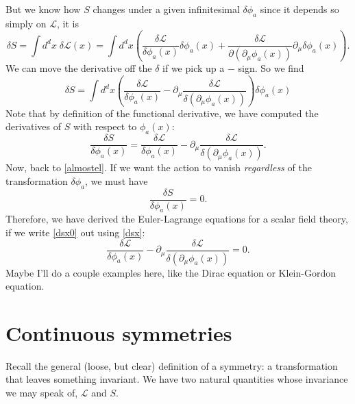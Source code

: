 \documentclass[main.tex]{subfiles}
\begin{document}
But we know how $S$ changes under a given infinitesimal $\delta \phi_a$ since it depends so simply on $\mathcal{L}$, it is
\[
\delta S = \int d^d x \; \delta \mathcal{L} (x) = \int d^d x \left( \frac{\delta \mathcal{L}}{\delta \phi_a (x)} \delta \phi_a (x) + \frac{\delta \mathcal{L}}{\partial (\partial_\mu \phi_a (x))} \partial_\mu \delta \phi_a (x) \right).
\]
We can move the derivative off the $\delta$ if we pick up a $-$ sign. So we find
\begin{equation} \label{almostel}
\delta S = \int d^d x \left(
\frac{\delta\mathcal{L}}{\delta \phi_a (x)} - \partial_\mu \frac{\delta \mathcal{L}}{\delta (\partial_\mu \phi_a (x))}
\right) \delta \phi_a (x)
\end{equation}
Note that by definition of the functional derivative, we have computed the derivatives of $S$ with respect to $\phi_a (x)$:
\begin{equation} \label{dsx}
\frac{\delta S}{\delta \phi_a (x)} =
\frac{\delta\mathcal{L}}{\delta \phi_a (x)} - \partial_\mu \frac{\delta \mathcal{L}}{\delta (\partial_\mu \phi_a (x))}.
\end{equation}
Now, back to \ref{almostel}. If we want the action to vanish \textit{regardless} of the transformation $\delta \phi_a$, we must have
\begin{equation} \label{dsx0}
\frac{\delta S}{\delta \phi_a (x)} = 0.
\end{equation}
Therefore, we have derived the Euler-Lagrange equations for a scalar field theory, if we write \ref{dsx0} out using \ref{dsx}:
\begin{equation} \label{elequation}
\frac{\delta\mathcal{L}}{\delta \phi_a (x)} - \partial_\mu \frac{\delta \mathcal{L}}{\delta (\partial_\mu \phi_a (x))} = 0.
\end{equation}
Maybe I'll do a couple examples here, like the Dirac equation or Klein-Gordon equation.
\section{Continuous symmetries}
Recall the general (loose, but clear) definition of a symmetry: a transformation that leaves something invariant. We have two natural quantities whose invariance we may speak of, $\mathcal{L}$ and $S$.
\end{document}
